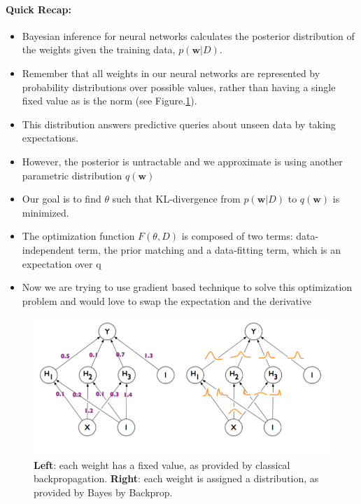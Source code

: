 \documentclass[main]{subfiles}
\begin{document}
\paragraph{Quick Recap:}
\begin{itemize}
    \item Bayesian inference for neural networks calculates the posterior distribution of the weights given the training data, $p(\bm{w}|D)$.
    \item Remember that all weights in our neural networks are represented by probability distributions over possible values, rather than having a single fixed value as is the norm (see Figure.\ref{fig:BbB_network}).
    \item This distribution answers predictive queries about unseen data by taking expectations.
    \item However, the posterior is untractable and we approximate is using another parametric distribution $q(\bm{w})$
    \item Our goal is to find $\theta$ such that KL-divergence from $p(\bm{w}|D)$ to $q(\bm{w})$ is minimized.
    \item The optimization function $F(\theta, D)$ is composed of two terms: data-independent term, the prior matching and a data-fitting term, which is an expectation over q
    \item Now we are trying to use gradient based technique to solve this optimization problem and would love to swap the expectation and the derivative
\end{itemize}

\begin{figure}[H]
    	\centering
    	\includegraphics[width=0.9\linewidth]{05_LearningAsBayesianInference/figures/BbB_network.png}
    	\caption{\textbf{Left}: each weight has a fixed value, as provided by classical backpropagation. \textbf{Right}: each weight is assigned a distribution, as provided by Bayes by Backprop.} 
    	\label{fig:BbB_network}
    \end{figure}
    
\end{document}
